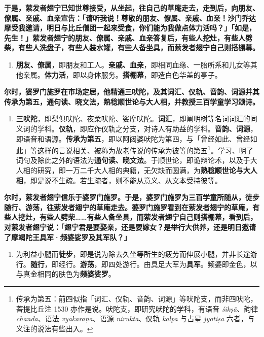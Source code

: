 \textbf{于是，萦发者翅宁已知世尊接受，从坐起，往自己的草庵走去，走到后，向朋友、僚属、亲戚、血亲宣告：「请听我说！尊敬的朋友、僚属、亲戚、血亲！沙门乔达摩受我邀请，明日与比丘僧团一起来受食，你们能为我做点体力活吗？」「如是，先生！」萦发者翅宁的朋友、僚属、亲戚、血亲答复后，有些人挖灶，有些人劈柴，有些人洗盘子，有些人装水罐，有些人备坐具，而萦发者翅宁自己则搭棚幕。}

\begin{enumerate}\item \textbf{朋友、僚属}，即朋友和工人。\textbf{亲戚、血亲}，即相同血缘、一胎所系和儿女等其他亲属。\textbf{体力活}，即以身体服务。\textbf{搭棚幕}，即造白色华盖的亭子。\end{enumerate}

\textbf{尔时，婆罗门施罗在市场定居，他精通三吠陀，及其词汇、仪轨、音韵、词源并其传承为第五，通句读、晓文法，熟稔顺世论与大人相，并教授三百学童学习颂诗。}

\begin{enumerate}\item \textbf{三吠陀}，即梨俱吠陀、夜柔吠陀、娑摩吠陀。\textbf{词汇}，即阐明树等名词词汇的同义词的学科。\textbf{仪轨}，即应作仪轨之分支，对诗人有助益的学科。\textbf{音韵、词源}，即语音和语源。\textbf{传承为第五}，即以阿闼婆吠陀为第四，与「曾经如此、曾经如此」等这样的言说相关、被称为故老传说的传承为彼等的第五\footnote{传承为第五：前四似指「词汇、仪轨、音韵、词源」等吠陀支，而非四吠陀，菩提比丘注 1530 亦作是说。吠陀支，即研究吠陀的学科，有语音 \textit{śikṣā}、韵律 \textit{chanda}、语法 \textit{vyākaraṇa}、语源 \textit{nirukta}、仪轨 \textit{kalpa} 与占星 \textit{jyotiṣa} 六者，与义注的说法有些出入。}。学习、明了词句及除此之外的语法为\textbf{通句读、晓文法}。于顺世论，即诡辩论术，以及于大人相的研究，即一万二千大人相的典籍，无欠缺而圆满，为\textbf{熟稔顺世论与大人相}，即是说不生疏。若生疏者，则不能从意义、从文本受持彼等。\end{enumerate}

\textbf{尔时，萦发者翅宁信乐于婆罗门施罗。于是，婆罗门施罗为三百学童所随从，徒步随行、游荡，往萦发者翅宁的草庵走去。婆罗门施罗看到在萦发者翅宁的草庵，有些人挖灶，有些人劈柴……有些人备坐具，而萦发者翅宁自己则搭棚幕，看到后，对萦发者翅宁说：「翅宁君是要娶亲，还是要嫁女？是举行大供养，还是明日邀请了摩竭陀王具军·频婆娑罗及其军队？」}

\begin{enumerate}\item 为利益小腿而\textbf{徒步}，即是说为除去久坐等所生的疲劳而伸展小腿，并非长途游行。\textbf{随行}，即经行。\textbf{游荡}，即四处游行。由具足大军为\textbf{具军}。频婆即金色，以与真金相同的肤色为\textbf{频婆娑罗}。\end{enumerate}

